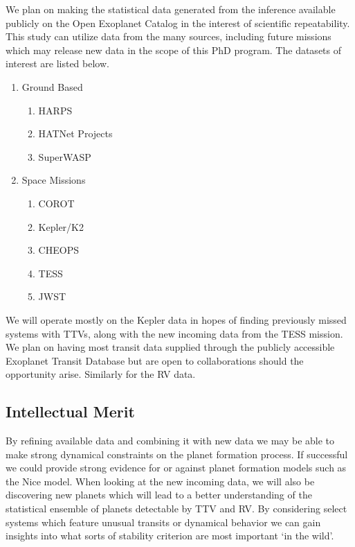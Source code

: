 We plan on making the statistical data generated from the inference available publicly on the Open Exoplanet Catalog in the interest of scientific repeatability.
This study can utilize data from the many sources, including future missions which may release new data in the scope of this PhD program. 
The datasets of interest are listed below.
\begin{enumerate}
      \item Ground Based
		\begin{enumerate}
      		\item HARPS
      		\item HATNet Projects
      		\item SuperWASP
      		\end{enumerate}
      \item Space Missions
      		\begin{enumerate}
            	\item COROT
      		\item Kepler/K2
           	\item CHEOPS
      		\item TESS
           	 \item JWST
      		\end{enumerate}
 \end{enumerate}
We will operate mostly on the Kepler data in hopes of finding previously missed systems with TTVs, along with the new incoming data from the TESS mission. We plan on having most transit data supplied through the publicly accessible Exoplanet Transit Database \cite{poddany2010exoplanet} but are open to collaborations should the opportunity arise. Similarly for the RV data.

\subsection{Intellectual Merit} 
By refining available data and combining it with new data we may be able to make strong dynamical constraints on the planet formation process. 
If successful we could provide strong evidence for or against planet formation models such as the Nice model.
When looking at the new incoming data, we will also be discovering new planets which will lead to a better understanding of the statistical ensemble of planets detectable by TTV and RV.
By considering select systems which feature unusual transits or dynamical behavior we can gain insights into what sorts of stability criterion are most important `in the wild'.

